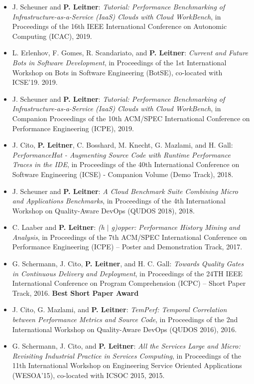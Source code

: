 \documentclass[paper=letter,fontsize=11pt]{scrartcl} %
\begin{document}
\begin{itemize}
	\item J. Scheuner and \textbf{P. Leitner}: \emph{Tutorial: Performance Benchmarking of Infrastructure-as-a-Service (IaaS) Clouds with Cloud WorkBench}, in Proceedings of the 16th IEEE International Conference on Autonomic Computing (ICAC), 2019.
	\item L. Erlenhov, F. Gomes, R. Scandariato, and \textbf{P. Leitner}: \emph{Current and Future Bots in Software Development}, in Proceedings of the 1st International Workshop on
Bots in Software Engineering (BotSE), co-located with ICSE'19. 2019.
	\item J. Scheuner and \textbf{P. Leitner}: \emph{Tutorial: Performance Benchmarking of Infrastructure-as-a-Service (IaaS) Clouds with Cloud WorkBench}, in Companion Proceedings of the 10th ACM/SPEC International Conference on Performance Engineering (ICPE), 2019.
	\item J. Cito, \textbf{P. Leitner}, C. Bosshard, M. Knecht, G. Mazlami, and H. Gall: \emph{PerformanceHat - Augmenting Source Code with Runtime Performance Traces in the IDE}, in Proceedings of the 40th International Conference on Software Engineering (ICSE) - Companion Volume (Demo Track), 2018.
	\item J. Scheuner and \textbf{P. Leitner}: \emph{A Cloud Benchmark Suite Combining Micro and Applications Benchmarks}, in Proceedings of the 4th International Workshop on Quality-Aware DevOps (QUDOS 2018), 2018.
	\item C. Laaber and \textbf{P. Leitner}: \emph{ (h $|$ g)opper: Performance History Mining and Analysis},  in Proceedings of the 7th ACM/SPEC International Conference on Performance Engineering (ICPE) -- Poster and Demonstration Track, 2017.
	\item G. Schermann, J. Cito, \textbf{P. Leitner}, and H. C. Gall: \emph{Towards Quality Gates in Continuous Delivery and Deployment}, in Proceedings of the 24TH IEEE International Conference on Program Comprehension (ICPC) – Short Paper Track, 2016. \textbf{Best Short Paper Award}
	\item J. Cito, G. Mazlami, and \textbf{P. Leitner}: \emph{TemPerf: Temporal Correlation between Performance Metrics and Source Code}, in Proceedings of the 2nd International Workshop on Quality-Aware DevOps (QUDOS 2016), 2016.
    \item G. Schermann, J. Cito, and \textbf{P. Leitner}: \emph{All the Services Large and Micro: Revisiting Industrial Practice in Services Computing}, in Proceedings of the 11th International Workshop on Engineering Service Oriented Applications (WESOA’15), co-located with ICSOC 2015, 2015.

\end{itemize}
\end{document}
